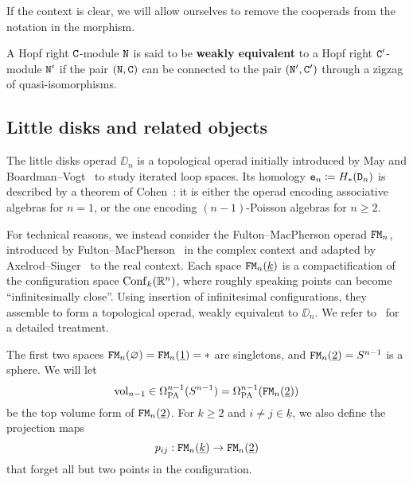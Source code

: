 If the context is clear, we will allow ourselves to remove the cooperads from the notation in the morphism.

\begin{definition}
  A Hopf right $\mathtt{C}$-module $\mathtt{N}$ is said to be \textbf{weakly equivalent} to a Hopf right $\mathtt{C}'$-module $\mathtt{N}'$ if the pair $(\mathtt{N}, \mathtt{C})$ can be connected to the pair $(\mathtt{N}', \mathtt{C}')$ through a zigzag of quasi-isomorphisms.
\end{definition}

\subsection{Little disks and related objects}
\label{cnf.sec.little-disks}

The little disks operad $\DD_{n}$ is a topological operad initially introduced by May and Boardman--Vogt~\cite{May1972,BoardmanVogt1973} to study iterated loop spaces.
Its homology $\mathtt{e}_{n} \coloneqq H_{*}(\mathtt{D}_{n})$ is described by a theorem of Cohen~\cite{Cohen1976}: it is either the operad encoding associative algebras for $n = 1$, or the one encoding $(n-1)$-Poisson algebras for $n \ge 2$.

For technical reasons, we instead consider the Fulton--MacPherson operad $\mathtt{FM}_{n}$, introduced by Fulton--MacPherson~\cite{FultonMacPherson1994} in the complex context and adapted by Axel\-rod--Sin\-ger~\cite{AxelrodSinger1994} to the real context.
Each space $\mathtt{FM}_{n}(\underline{k})$ is a compactification of the configuration space $\operatorname{Conf}_{k}(\mathbb{R}^{n})$, where roughly speaking points can become ``infinitesimally close''.
Using insertion of infinitesimal configurations, they assemble to form a topological operad, weakly equivalent to $\DD_{n}$.
We refer to~\cite{Sinha2004} for a detailed treatment.

The first two spaces $\mathtt{FM}_{n}(\varnothing) = \mathtt{FM}_{n}(\underline{1}) = *$ are singletons, and $\mathtt{FM}_{n}(\underline{2}) = S^{n-1}$ is a sphere.
We will let
\begin{equation}
  \label{cnf.eq.def-vol}
  \mathrm{vol}_{n-1} \in \Omega_{\mathrm{PA}}^{n-1}(S^{n-1}) = \Omega_{\mathrm{PA}}^{n-1}(\mathtt{FM}_{n}(\underline{2}))
\end{equation}
be the top volume form of $\mathtt{FM}_{n}(\underline{2})$.
For $k \geq 2$ and $i \neq j \in \underline{k}$, we also define the projection maps
\begin{equation}
  \label{cnf.eq.pij}
  p_{ij} : \mathtt{FM}_{n}(\underline{k}) \to \mathtt{FM}_{n}(\underline{2})
\end{equation}
that forget all but two points in the configuration.

